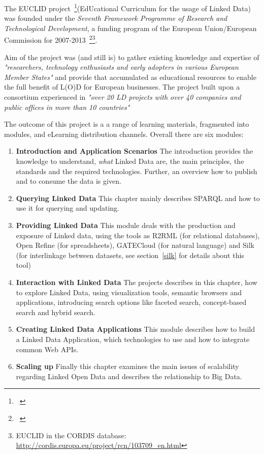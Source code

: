 The EUCLID project~\footnote{~\cite{euclid:home}}(EdUcational Curriculum for the usage of Linked Data) was founded under the \emph{Seventh Framework Programme of Research and Technological Development}, a funding program of the European Union/European Commission for 2007-2013~\footnote{~\cite{eu:fp7}}\footnote{EUCLID in the CORDIS database: \url{http://cordis.europa.eu/project/rcn/103709_en.html}}.

Aim of the project was (and still is) to gather existing knowledge and expertise of \emph{"researchers, technology enthusiasts and early adopters in various European Member States"} and provide that accumulated as educational resources to enable the  full benefit of L(O)D for European businesses. The project built upon a consortium experienced in \emph{"over 20 LD projects with over 40 companies and public offices in more than 10 countries"}~\cite{euclid:about}

The outcome of this project is a a range of learning materials, fragmented into modules, and eLearning distribution channels. Overall there are six modules:

\begin{enumerate}
	\item \textbf{Introduction and Application Scenarios}
	The introduction provides the knowledge to understand, \emph{what} Linked Data are, the main principles, the standards and the required technologies. Further, an overview how to publish and to consume the data is given.
	\item \textbf{Querying Linked Data}
	This chapter mainly describes SPARQL and how to use it for querying and updating.
	\item \textbf{Providing Linked Data}
	This module deals with the production and exposure of Linked data, using the tools as R2RML (for relational databases), Open Refine (for spreadsheets), GATECloud (for natural language) and Silk (for interlinkage between datasets, see section~\ref{silk} for details about this tool)
	\item \textbf{Interaction with Linked Data}
	The projects describes in this chapter, how to explore Linked Data, using visualization tools, semantic browsers and applications, introducing search options like faceted search, concept-based search and hybrid search.
	\item \textbf{Creating Linked Data Applications}
	This module describes how to build a Linked Data Application, which technologies to use and how to integrate common Web APIs.
	\item \textbf{Scaling up}
	Finally this chapter examines the main issues of scalability regarding Linked Open Data and describes the relationship to Big Data.
\end{enumerate}

